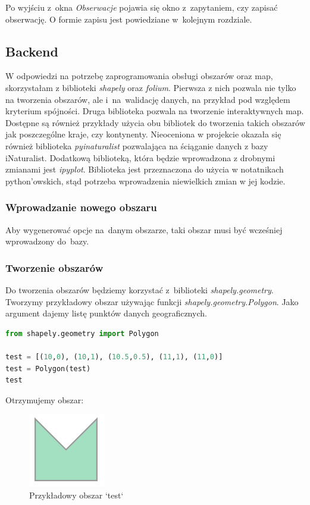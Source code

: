 \documentclass{article}
\begin{document}
Po wyjściu z~okna \textit{Obserwacje} pojawia się okno z~zapytaniem, czy zapisać obserwację. O formie zapisu jest powiedziane w~kolejnym rozdziale.

\newpage
 \subsection{Backend}
 W odpowiedzi na potrzebę zaprogramowania obsługi obszarów oraz map, skorzystałam z biblioteki \textit{shapely} oraz \textit{folium}. Pierwsza z nich pozwala nie tylko na tworzenia obszarów, ale i~na~walidację danych, na przykład pod względem kryterium spójności. Druga biblioteka pozwala na tworzenie interaktywnych map. Dostępne są również przykłady użycia obu bibliotek do tworzenia takich obszarów jak poszczególne kraje, czy kontynenty. Nieoceniona w projekcie okazała się również biblioteka \textit{pyinaturalist} pozwalająca na ściąganie danych z bazy iNaturalist. Dodatkową biblioteką, która będzie wprowadzona z drobnymi zmianami jest \textit{ipyplot}. Biblioteka jest przeznaczona do użycia w notatnikach python'owskich, stąd potrzeba wprowadzenia niewielkich zmian w jej kodzie.
 
  \subsubsection{Wprowadzanie nowego obszaru}
 Aby wygenerować opcje na~danym obszarze, taki obszar musi być wcześniej wprowadzony do~bazy. 
 
 \subsubsection*{Tworzenie obszarów}
Do tworzenia obszarów będziemy korzystać z~biblioteki \textit{shapely.geometry}.
Tworzymy przykładowy obszar używając funkcji \textit{shapely.geometry.Polygon}. Jako argument dajemy listę punktów danych geograficznych.

\begin{lstlisting}[language=Python, caption=Przykładowy obszar]
from shapely.geometry import Polygon

test = [(10,0), (10,1), (10.5,0.5), (11,1), (11,0)]
test = Polygon(test)
test
\end{lstlisting}
Otrzymujemy obszar:

\begin{figure}[h] 
\begin{center}
\includegraphics[scale =1]{"polygon.PNG"}
\end{center}
\caption{Przykładowy obszar `test`}
\label{test}
\end{figure}
\end{document}
